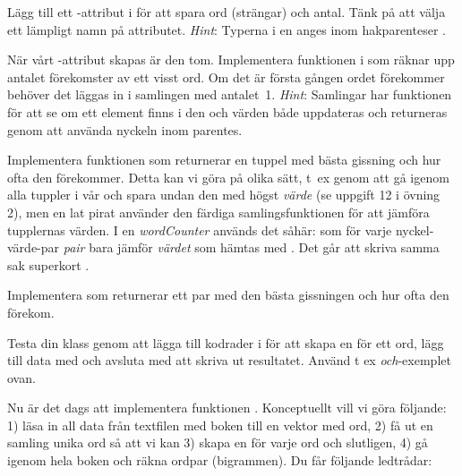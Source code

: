 \Subtask Lägg till ett -attribut i  för att spara ord (strängar) och antal. Tänk på att välja ett lämpligt namn på attributet. \emph{Hint}: Typerna i en  anges inom hakparenteser .

\Subtask När vårt -attribut skapas är den tom. Implementera funktionen  i  som räknar upp antalet förekomster av ett visst ord. Om det är första gången ordet förekommer behöver det läggas in i samlingen med antalet~1. \emph{Hint}: Samlingar har funktionen  för att se om ett element finns i den och värden både uppdateras och returneras genom att använda nyckeln inom parentes.

\Subtask Implementera funktionen  som returnerar en tuppel med bästa gissning och hur ofta den förekommer. Detta kan vi göra på olika sätt, t~ex genom att gå igenom alla tuppler i vår  och spara undan den med högst \emph{värde} (se uppgift 12 i övning 2), men en lat pirat använder den färdiga samlingsfunktionen  för att jämföra tupplernas värden. I en  \emph{wordCounter} används det såhär:  som för varje nyckel-värde-par \emph{pair} bara jämför \emph{värdet} som hämtas med . Det går att skriva samma sak superkort .

\Subtask Implementera  som returnerar ett par med den bästa gissningen och hur ofta den förekom.

\Subtask Testa din klass genom att lägga till kodrader i  för att skapa en  för ett ord, lägg till data med  och avsluta med att skriva ut resultatet. Använd t ex  \emph{och}-exemplet ovan.

\Subtask Nu är det dags att implementera funktionen . Konceptuellt vill vi göra följande: 1) läsa in all data från textfilen med boken till en vektor med ord, 2) få ut en samling unika ord så att vi kan 3) skapa en  för varje ord och slutligen, 4) gå igenom hela boken och räkna ordpar (bigrammen).
\noindent
Du får följande ledtrådar:


